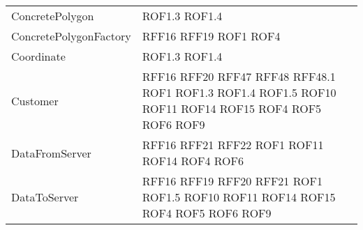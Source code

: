 \begin{longtable}{p{5cm}!{\VRule[1pt]}p{2.5cm}}
	ConcretePolygon & ROF1.3 \newline ROF1.4\\
	ConcretePolygonFactory & RFF16 \newline RFF19 \newline ROF1 \newline ROF4\\
	Coordinate & ROF1.3 \newline ROF1.4\\
	Customer & RFF16 \newline RFF20 \newline RFF47 \newline RFF48 \newline RFF48.1 \newline ROF1 \newline ROF1.3 \newline ROF1.4 \newline ROF1.5 \newline ROF10 \newline ROF11 \newline ROF14 \newline ROF15 \newline ROF4 \newline ROF5 \newline ROF6 \newline ROF9\\
	DataFromServer & RFF16 \newline RFF21 \newline RFF22 \newline ROF1 \newline ROF11 \newline ROF14 \newline ROF4 \newline ROF6\\
	DataToServer & RFF16 \newline RFF19 \newline RFF20 \newline RFF21 \newline ROF1 \newline ROF1.5 \newline ROF10 \newline ROF11 \newline ROF14 \newline ROF15 \newline ROF4 \newline ROF5 \newline ROF6 \newline ROF9\\

\end{longtable}
